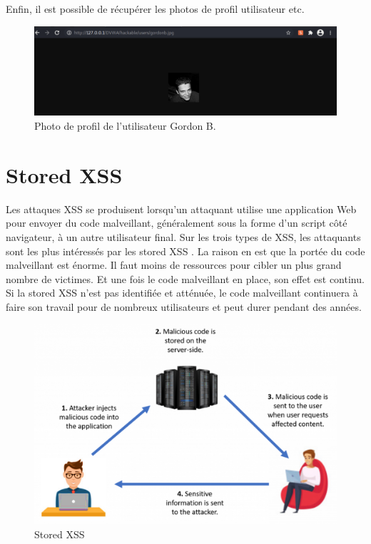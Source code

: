 \documentclass[12pt, oneside]{article}
\begin{document}
Enfin, il est possible de récupérer les photos de profil utilisateur etc.

\begin{figure}[H]
\centering
\includegraphics[scale=0.4]{10}
\caption{Photo de profil de l'utilisateur Gordon B.}
\end{figure}

\section{Stored XSS}
Les attaques XSS se produisent lorsqu'un attaquant utilise une application Web pour envoyer du code malveillant, généralement sous la forme d'un script côté navigateur, à un autre utilisateur final. Sur les trois types de XSS, les attaquants sont les plus intéressés par les stored XSS . La raison en est que la portée du code malveillant est énorme. Il faut moins de ressources pour cibler un plus grand nombre de victimes. Et une fois le code malveillant en place, son effet est continu. Si la stored XSS n'est pas identifiée et atténuée, le code malveillant continuera à faire son travail pour de nombreux utilisateurs et peut durer pendant des années.

\begin{figure}[H]
\centering
\includegraphics[scale=0.4]{11}
\caption{Stored XSS}
\end{figure}
\end{document}
